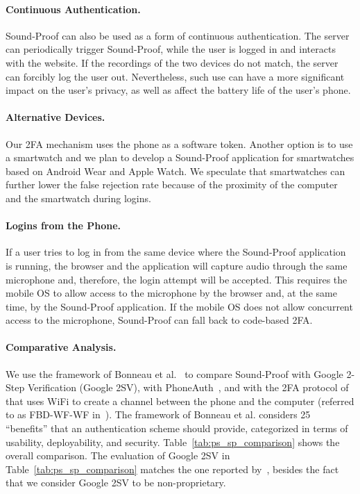 \paragraph{Continuous Authentication.}
Sound-Proof can also be used as a form of continuous authentication. The server can periodically trigger Sound-Proof, while the user is logged in and interacts with the website. If the recordings of the two devices do not match, the server can forcibly log the user out. Nevertheless, such use can have a more significant impact on the user's privacy, as well as affect the battery life of the user's phone.

\paragraph{Alternative Devices.}
Our 2FA mechanism uses the phone as a software token.
Another option is to use a smartwatch and we plan to develop a Sound-Proof application for smartwatches based on Android Wear and Apple Watch.
We speculate that smartwatches can further lower the false rejection rate because of the proximity of the computer and the smartwatch during logins.

\paragraph{Logins from the Phone.}
If a user tries to log in from the same device where the Sound-Proof application is running,
the browser and the application will capture audio through the same microphone and, therefore, the login attempt will be accepted. This requires the mobile OS to allow access to the microphone by the browser and, at the same time, by the Sound-Proof application.
If the mobile OS does not allow concurrent access to the microphone, Sound-Proof can fall back to code-based 2FA.


\paragraph{Comparative Analysis.}
We use the framework of Bonneau et al.~\cite{bonneau12sp} to compare Sound-Proof with Google 2-Step Verification (Google 2SV), with PhoneAuth~\cite{czeskis12ccs}, and with  the 2FA protocol of~\cite{shirvanian14} that uses WiFi to create a channel between the phone and the computer (referred to as FBD-WF-WF in~\cite{shirvanian14}).
The framework of  Bonneau et al. considers 25 ``benefits'' that an authentication scheme should provide, categorized in terms of usability, deployability, and security.
Table~\ref{tab:ps_sp_comparison} shows the overall comparison.
The evaluation of Google 2SV in Table~\ref{tab:ps_sp_comparison} matches the one reported by~\cite{bonneau12sp}, besides the fact that we consider Google 2SV to be non-proprietary.

